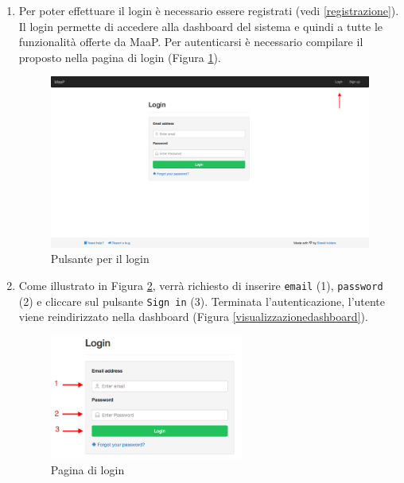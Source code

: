 		\begin{enumerate}
			
			\item Per poter effettuare il login è necessario essere registrati (vedi \ref{registrazione}). \\
			Il login permette di accedere alla dashboard del sistema e quindi a tutte le funzionalità offerte da MaaP. Per autenticarsi è necessario compilare il  proposto nella pagina di login (Figura \ref{fig:loginButton}). 

			\begin{figure}[H]
				\centering \includegraphics[width=1\textwidth]{img/pulsanteLogin.png}
			\caption{ \label{fig:loginButton} Pulsante per il login}
			\end{figure}

			\item Come illustrato in Figura \ref{fig:login}, verrà richiesto di inserire \texttt{email} (1), \texttt{password} (2) e cliccare sul pulsante \texttt{Sign in} (3). Terminata l'autenticazione, l'utente viene reindirizzato nella dashboard (Figura \ref{visualizzazionedashboard}).

			\begin{figure}[H]
				\centering \includegraphics[width=0.6\textwidth]{img/login.png}
			\caption{ \label{fig:login} Pagina di login}
			\end{figure}
		\end{enumerate}

